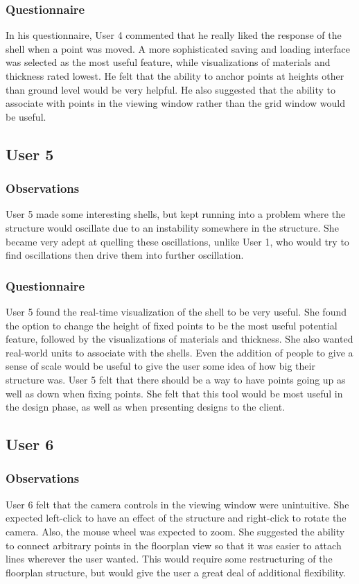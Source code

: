 \documentclass{thesis}
\begin{document}
\subsubsection{Questionnaire}
In his questionnaire, User 4 commented that he really liked the response of the shell when a point was moved.  A more sophisticated
saving and loading interface was selected as the most useful feature, while visualizations of materials and thickness rated lowest.
He felt that the ability to anchor points at heights other than ground level would be very helpful.  He also suggested that the ability
to associate with points in the viewing window rather than the grid window would be useful.

\subsection{User 5}
\subsubsection{Observations}
User 5 made some interesting shells, but kept running into a problem where the structure would oscillate due to an instability
somewhere in the structure.  She became very adept at quelling these oscillations, unlike User 1, who would try to find oscillations
then drive them into further oscillation.

\subsubsection{Questionnaire}
User 5 found the real-time visualization of the shell to be very useful.  She found the option to change the height of fixed points
to be the most useful potential feature, followed by the visualizations of materials and thickness.  She also wanted real-world
units to associate with the shells.  Even the addition of people to give a sense of scale would be useful to give the user some
idea of how big their structure was.  User 5 felt that there should be a way to have points going up as well as down when fixing
points.  She felt that this tool would be most useful in the design phase, as well as when presenting designs to the client.

\subsection{User 6}
\subsubsection{Observations}
User 6 felt that the camera controls in the viewing window were unintuitive.  She expected left-click to have an effect of the
structure and right-click to rotate the camera.  Also, the mouse wheel was expected to zoom.  She suggested the ability to
connect arbitrary points in the floorplan view so that it was easier to attach lines wherever the user wanted.  This would
require some restructuring of the floorplan structure, but would give the user a great deal of additional flexibility.
\end{document}
